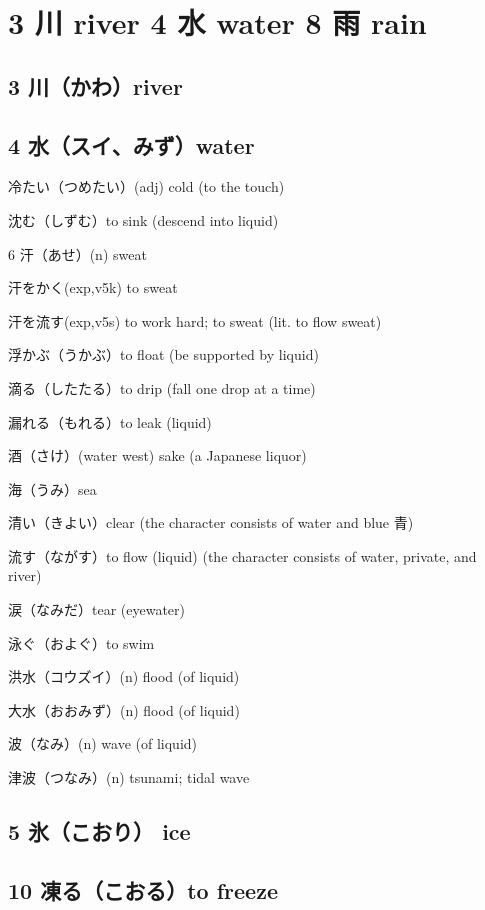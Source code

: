 \chapter{3 川 river 4 水 water 8 雨 rain}

\section{3 川（かわ）river}

\section{4 水（スイ、みず）water}

冷たい（つめたい）(adj) cold (to the touch)

沈む（しずむ）to sink (descend into liquid)

6 汗（あせ）(n) sweat

汗をかく(exp,v5k) to sweat

汗を流す(exp,v5s) to work hard; to sweat (lit. to flow sweat)

浮かぶ（うかぶ）to float (be supported by liquid)

滴る（したたる）to drip (fall one drop at a time)

漏れる（もれる）to leak (liquid)

酒（さけ）(water west) sake (a Japanese liquor)

海（うみ）sea

清い（きよい）clear (the character consists of water and blue 青)

流す（ながす）to flow (liquid) (the character consists of water, private, and river)

涙（なみだ）tear (eyewater)

泳ぐ（およぐ）to swim

洪水（コウズイ）(n) flood (of liquid)

大水（おおみず）(n) flood (of liquid)

波（なみ）(n) wave (of liquid)

津波（つなみ）(n) tsunami; tidal wave

\section{5 氷（こおり） ice}

\section{10 凍る（こおる）to freeze}

